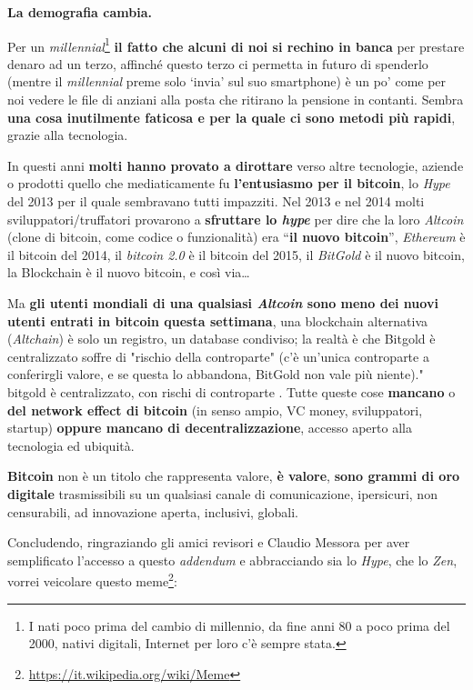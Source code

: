 \documentclass[a4paper,12pt,italian]{article}
\begin{document}
\textbf{La demografia cambia.}

\bigskip

Per un \emph{millennial}\footnote{I nati poco prima del cambio di millennio, da fine anni 80 a poco prima del 2000, nativi digitali,
Internet per loro c'è sempre stata.} \textbf{il fatto che alcuni di noi si rechino in banca} per prestare denaro
ad un terzo, affinché questo terzo ci permetta in futuro di spenderlo (mentre il \emph{millennial} preme solo ‘invia’ sul suo
smartphone) è un po’ come per noi vedere le file di anziani alla posta che ritirano la pensione in contanti. Sembra
\textbf{una cosa inutilmente faticosa e per la quale ci sono metodi più rapidi}, grazie alla
tecnologia.

\smallskip

In questi anni \textbf{molti hanno provato a dirottare} verso altre tecnologie,
aziende o prodotti quello che mediaticamente fu \textbf{l’entusiasmo per il bitcoin}, lo \emph{Hype} del 2013 per il
quale sembravano tutti impazziti. Nel 2013 e nel 2014 molti sviluppatori/truffatori provarono a \textbf{sfruttare
lo \emph{hype}} per dire che la loro \emph{Altcoin} (clone di bitcoin, come codice o funzionalità) era “\textbf{il
nuovo bitcoin}”, \emph{Ethereum} è il bitcoin del 2014, il \emph{bitcoin 2.0} è il bitcoin del 2015, il \emph{BitGold} è il nuovo
bitcoin, la Blockchain è il nuovo bitcoin, e così via\ldots

Ma \textbf{gli utenti mondiali di una qualsiasi \emph{Altcoin} sono meno dei nuovi utenti entrati in bitcoin
questa settimana}, una blockchain alternativa (\emph{Altchain}) è solo un registro, un database condiviso; la
realtà è che Bitgold è centralizzato soffre di "rischio della controparte" (c'è un'unica controparte a conferirgli valore, e se questa lo abbandona, BitGold non vale più niente)." bitgold è centralizzato, 
con rischi di controparte . Tutte queste cose \textbf{mancano} o \textbf{del network effect di
bitcoin} (in senso ampio, VC money, sviluppatori, startup) \textbf{oppure mancano di
decentralizzazione}, accesso aperto alla tecnologia ed ubiquità.


\bigskip


\textbf{Bitcoin} non è un titolo che rappresenta valore, \textbf{è valore},
\textbf{sono grammi di oro digitale} trasmissibili su un qualsiasi canale di comunicazione,
ipersicuri, non censurabili, ad innovazione aperta, inclusivi, globali.


\bigskip

Concludendo, ringraziando gli amici revisori e Claudio Messora per aver semplificato l'accesso a questo \emph{addendum} e abbracciando sia lo \emph{Hype}, che lo \emph{Zen},
vorrei veicolare questo meme\footnote{\url{https://it.wikipedia.org/wiki/Meme}}: 
\bigskip
\end{document}
